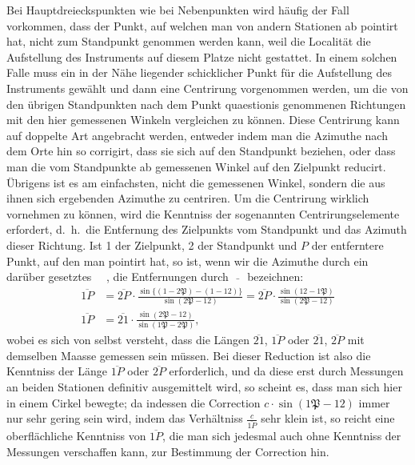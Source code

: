 \documentclass[12pt,a4paper]{article}
\theoremstyle{plain}
\theoremstyle{definition}
\theoremstyle{remark}
\begin{document}
Bei Hauptdreieckspunkten wie bei Nebenpunkten wird h\"aufig der Fall vorkommen, dass der Punkt, auf welchen man von andern Stationen ab pointirt hat, nicht zum Standpunkt genommen werden kann, weil die Localit\"at die Aufstellung des Instruments auf diesem Platze nicht gestattet. In einem solchen Falle muss ein in der N\"ahe liegender schicklicher Punkt f\"ur die Aufstellung des Instruments gew\"ahlt und dann eine Centrirung vorgenommen werden, um die von den \"ubrigen Standpunkten nach dem Punkt quaestionis genommenen Richtungen mit den hier gemessenen Winkeln vergleichen zu k\"onnen. Diese Centrirung kann auf doppelte Art angebracht werden, entweder indem man die Azimuthe nach dem Orte hin so corrigirt, dass sie sich auf den Standpunkt beziehen, oder dass man die vom Standpunkte ab gemessenen Winkel auf den Zielpunkt reducirt. \"Ubrigens ist es am einfachsten, nicht die gemessenen Winkel, sondern die aus ihnen sich ergebenden Azimuthe zu centriren. Um die Centrirung wirklich vornehmen zu k\"onnen, wird die Kenntniss der sogenannten Centrirungselemente erfordert, d.\ h.\ die Entfernung des Zielpunkts vom Standpunkt und das Azimuth dieser Richtung. Ist 1 der Zielpunkt, 2 der Standpunkt und $P$ der entferntere Punkt, auf den man pointirt hat, so ist, wenn wir die Azimuthe durch ein dar\"uber gesetztes $\mathfrak{\quad}$, die Entfernungen durch $\bar{\quad}$ bezeichnen:
\begin{align*}
\overline{1P} &= \overline{2P} \cdot \frac{\sin\{(\mathfrak{1} - \mathfrak{2P}) - (\mathfrak{1} - \mathfrak{12})\}}{\sin(\mathfrak{2P} - \mathfrak{12})} = \overline{2P} \cdot \frac{\sin(\mathfrak{12} - \mathfrak{1P})}{\sin(\mathfrak{2P} - \mathfrak{12})}\\
\overline{1P} &= \overline{21} \cdot \frac{\sin(\mathfrak{2P} - \mathfrak{12})}{\sin(\mathfrak{1P} - \mathfrak{2P})},
\end{align*}
wobei es sich von selbst versteht, dass die L\"angen $\overline{21}$, $\overline{1P}$ oder $\overline{21}$, $\overline{2P}$ mit demselben Maasse gemessen sein m\"ussen. Bei dieser Reduction ist also die Kenntniss der L\"ange $\overline{1P}$ oder $\overline{2P}$ erforderlich, und da diese erst durch Messungen an beiden Stationen definitiv ausgemittelt wird, so scheint es, dass man sich hier in einem Cirkel bewegte; da indessen die Correction $c \cdot \sin(\mathfrak{1P} - \mathfrak{12})$ immer nur sehr gering sein wird, indem das Verh\"altniss $\frac{c}{\overline{1P}}$ sehr klein ist, so reicht eine oberfl\"achliche Kenntniss von $\overline{1P}$, die man sich jedesmal auch ohne Kenntniss der Messungen verschaffen kann, zur Bestimmung der Correction hin.
\end{document}
